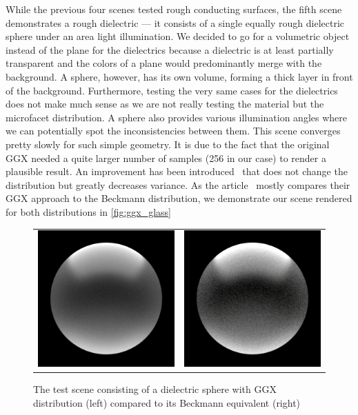 While the previous four scenes tested rough conducting surfaces, the fifth scene demonstrates a rough dielectric --- it consists of a single equally rough dielectric sphere under an area light illumination. We decided to go for a volumetric object instead of the plane for the dielectrics because a dielectric is at least partially transparent and the colors of a plane would predominantly merge with the background. A sphere, however, has its own volume, forming a thick layer in front of the background. Furthermore, testing the very same cases for the dielectrics does not make much sense as we are not really testing the material but the microfacet distribution. A sphere also provides various illumination angles where we can potentially spot the inconsistencies between them. This scene converges pretty slowly for such simple geometry. It is due to the fact that the original GGX needed a quite larger number of samples (256 in our case) to render a plausible result. An improvement has been introduced~\cite{heitz2018sampling} that does not change the distribution but greatly decreases variance. As the article~\cite{walter2007microfacet} mostly compares their GGX approach to the Beckmann distribution, we demonstrate our scene rendered for both distributions in \autoref{fig:ggx_glass}

\begin{figure}[h]
	\begin{tabular}{cc}
		\includegraphics[width=.45\linewidth]{img/ggx_glass.png}
		&
		\includegraphics[width=.45\linewidth]{img/beckmann_glass.png}
	\end{tabular}
	\caption{The test scene consisting of a dielectric sphere with GGX distribution (left) compared to its Beckmann equivalent (right)}
	\label{fig:ggx_glass}
\end{figure}

